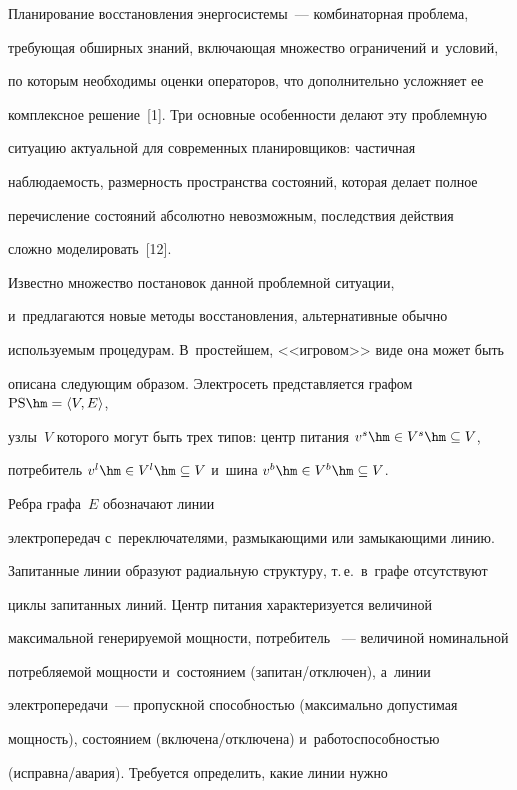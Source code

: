 Планирование восстановления энергосистемы~--- комбинаторная проблема, 


требующая обширных знаний, включающая множество ограничений и~условий, 


по которым необходимы оценки операторов, что дополнительно усложняет ее 


комплексное решение~[1]. Три основные особенности делают эту проблемную 


ситуацию актуальной для современных планировщиков: частичная 


наблюдаемость, размерность пространства состояний, которая делает полное 


перечисление состояний абсолютно невозможным, последствия действия 


сложно моделировать~[12]. 


  


  Известно множество постановок данной проблемной ситуации, 


и~предлагаются новые методы восстановления, альтернативные обычно 


используемым процедурам. В~простейшем, <<игровом>> виде она может быть 


описана сле\-ду\-ющим образом. Электросеть представляется графом $\mathrm{PS}\hm=\langle V, E\rangle$, 


узлы~$V$   которого могут быть трех типов: центр питания $v^s\hm\in V^s\hm\subseteq V$, 


потребитель $v^l\hm\in V^l\hm\subseteq V$  и~шина $v^b\hm\in V^b\hm\subseteq V$. 


Реб\-ра графа~$E$ обозначают линии 


электропередач с~переключателями, размыкающими или замыкающими линию. 


Запитанные линии образуют радиальную структуру, т.\,е.\ в~графе отсутствуют 


циклы запитанных линий. Центр питания характеризуется величиной 


максимальной генерируемой мощ\-ности, по\-тре\-би\-тель ~--- величиной номинальной 


потребляемой мощности и~со\-сто\-яни\-ем (за\-пи\-тан\!/\!от\-клю\-чен), а~линии 


электропередачи~--- пропускной спо\-соб\-ностью (максимально допустимая 


мощность), со\-сто\-яни\-ем (вклю\-че\-на\!/\!от\-клю\-че\-на) и~работоспособностью 


(ис\-прав\-на\!/\!ава\-рия). Требуется определить, какие линии нужно  


